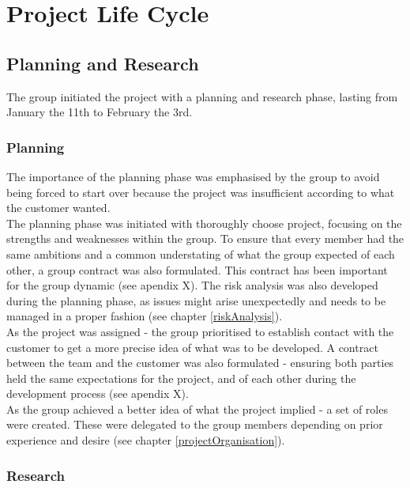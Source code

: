 
\chapter{Project Life Cycle}

\section{Planning and Research}
The group initiated the project with a planning and research phase, lasting from January the 11th to February the 3rd. 

\subsection{Planning}
The importance of the planning phase was emphasised by the group to avoid being forced to start over because the project was insufficient according to what the customer wanted. \\

The planning phase was initiated with thoroughly choose project, focusing on the strengths and weaknesses within the group. To ensure that every member had the same ambitions and a common understating of what the group expected of each other, a group contract was also formulated. This contract has been important for the group dynamic (see apendix X). The risk analysis was also developed during the planning phase, as issues might arise unexpectedly and needs to be managed in a proper fashion (see chapter \ref{riskAnalysis}).  \\  

As the project was assigned - the group prioritised to establish contact with the customer to get a more precise idea of what was to be developed. A contract between the team and the customer was also formulated - ensuring both parties held the same expectations for the project, and of each other during the development process (see apendix X).\\

As the group achieved a better idea of what the project implied - a set of roles were created. These were delegated to the group members depending on prior experience and desire (see chapter \ref{projectOrganisation}).

\subsection{Research}

